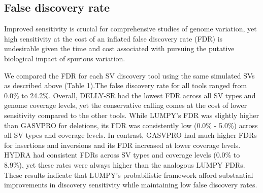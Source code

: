 \documentclass[10pt]{bmc_article}
\newenvironment{bmcformat}{\begin{raggedright}\baselineskip20pt\sloppy\setboolean{publ}{false}}{\end{raggedright}\baselineskip20pt\sloppy}
\begin{document}
\begin{bmcformat}
%
%

\subsection*{False discovery rate}
Improved sensitivity is crucial for comprehensive studies of genome variation,
yet high sensitivity at the cost of an inflated false discovery rate (FDR) is
undesirable given the time and cost associated with pursuing the putative
biological impact of spurious variation.

We compared the FDR for each SV discovery tool using the same simulated
SVs as described above (Table 1).The false discovery rate for all tools ranged
from 0.0\% to 24.2\%. Overall, DELLY-SR had the lowest FDR across all SV types
and genome coverage levels, yet the conservative calling comes at the cost of
lower sensitivity compared to the other tools. While LUMPY's FDR was
slightly higher than GASVPRO for deletions, its FDR was consistently
low (0.0\% - 5.0\%) across all SV types and coverage levels. In contrast,
GASVPRO had much higher FDRs for insertions and inversions and
its FDR increased at lower coverage levels.  HYDRA had consistent FDRs across
SV types and coverage levels (0.0\% to 8.9\%), yet these rates were always
higher than the analogous LUMPY FDRs. These results indicate that LUMPY's
probabilistic framework afford substantial improvements in discovery
sensitivity while maintaining low false discovery rates.


\end{bmcformat}
\end{document}

